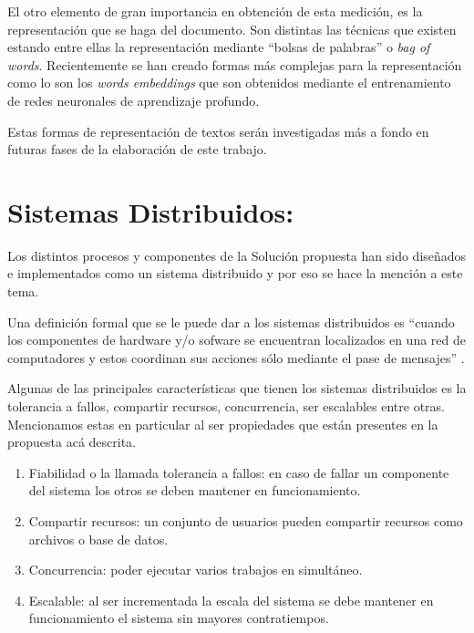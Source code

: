 \documentclass[
  10,
  openany]{book}
\begin{document}
El otro elemento de gran importancia en obtención de esta medición, es la representación que se haga del documento. Son distintas las técnicas que existen estando entre ellas la representación mediante ``bolsas de palabras'' o \emph{bag of words}. Recientemente se han creado formas más complejas para la representación como lo son los \emph{words embeddings} que son obtenidos mediante el entrenamiento de redes neuronales de aprendizaje profundo.

Estas formas de representación de textos serán investigadas más a fondo en futuras fases de la elaboración de este trabajo.

\hypertarget{sistemas-distribuidos}{%
\section{Sistemas Distribuidos:}\label{sistemas-distribuidos}}

Los distintos procesos y componentes de la Solución propuesta han sido diseñados e implementados como un sistema distribuido y por eso se hace la mención a este tema.

Una definición formal que se le puede dar a los sistemas distribuidos es ``cuando los componentes de hardware y/o sofware se encuentran localizados en una red de computadores y estos coordinan sus acciones sólo mediante el pase de mensajes'' \citep{distribu2012}.

Algunas de las principales características que tienen los sistemas distribuidos es la tolerancia a fallos, compartir recursos, concurrencia, ser escalables \citep{czaja2018} entre otras. Mencionamos estas en particular al ser propiedades que están presentes en la propuesta acá descrita.

\begin{enumerate}
\def\labelenumi{\arabic{enumi}.}
\item
  Fiabilidad o la llamada tolerancia a fallos: en caso de fallar un componente del sistema los otros se deben mantener en funcionamiento.
\item
  Compartir recursos: un conjunto de usuarios pueden compartir recursos como archivos o base de datos.
\item
  Concurrencia: poder ejecutar varios trabajos en simultáneo.
\item
  Escalable: al ser incrementada la escala del sistema se debe mantener en funcionamiento el sistema sin mayores contratiempos.
\end{enumerate}
\end{document}
